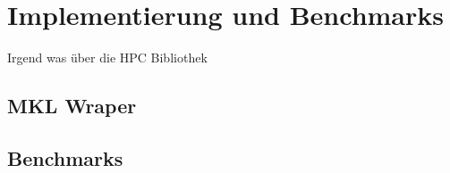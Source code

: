 \chapter{Implementierung und Benchmarks}
Irgend was über die HPC Bibliothek
\section{MKL Wraper}

\section{Benchmarks}